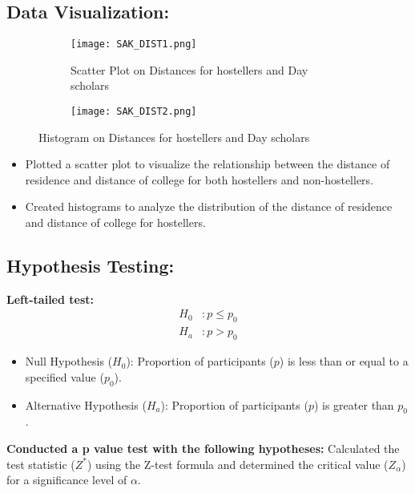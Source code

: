 \documentclass[oneside]{book}
\begin{document}
\subsection{Data Visualization:}
    
\begin{figure}[h]
    \centering
    \begin{subfigure}{0.45\textwidth} %
        \centering
        \texttt{[image: SAK\_DIST1.png]}
        \caption{Scatter Plot on Distances for hostellers and Day scholars}
        \label{fig:public_central}
    \end{subfigure}
    \hfill
    \begin{subfigure}{0.45\textwidth} %
        \centering
        \texttt{[image: SAK\_DIST2.png]}
        \caption{}
        \label{fig:pvt_central}
    \end{subfigure}
    \caption{Histogram on Distances for hostellers and Day scholars}
    \label{fig:central_tendencies}
\end{figure}


    \begin{itemize}
        \item Plotted a scatter plot to visualize the relationship between the distance of residence and distance of college for both hostellers and non-hostellers.
        \item Created histograms to analyze the distribution of the distance of residence and distance of college for hostellers.
    \end{itemize}


\subsection{Hypothesis Testing:}
 \textbf{ Left-tailed test:}
        \[
        \begin{aligned}
            H_0 & : p \leq p_0\\
            H_a & : p  > p_0
        \end{aligned}
        \]

        \begin{itemize}
            \item Null Hypothesis (\(H_0\)): Proportion of participants (\(p\)) is less than or equal to a specified value (\(p_0\)).
            \item Alternative Hypothesis (\(H_a\)): Proportion of participants (\(p\)) is greater than \(p_0\).
        \end{itemize}
\textbf{Conducted a p value test with the following hypotheses:}        
\text Calculated the test statistic (\(Z^*\)) using the Z-test formula and determined the critical value (\(Z_\alpha\)) for a significance level of \( \alpha \).
\end{document}
